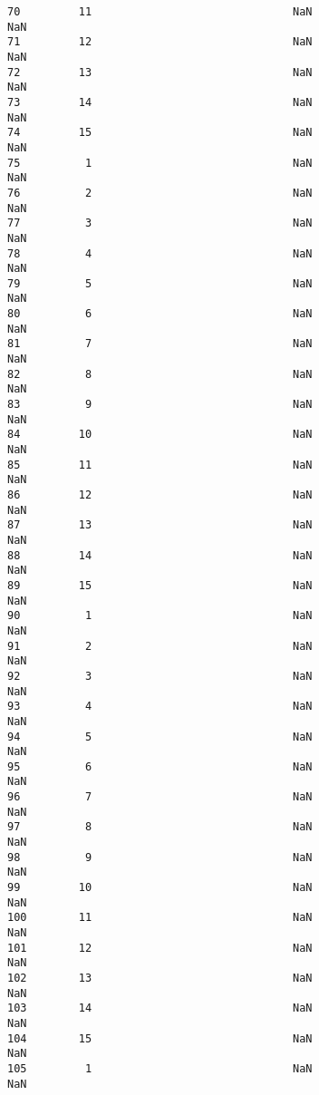 \documentclass[11pt]{article}
\begin{document}
\begin{tcolorbox}[breakable, size=fbox, boxrule=.5pt, pad at break*=1mm, opacityfill=0]
\begin{Verbatim}[commandchars=\\\{\}]
70         11                               NaN                       NaN
71         12                               NaN                       NaN
72         13                               NaN                       NaN
73         14                               NaN                       NaN
74         15                               NaN                       NaN
75          1                               NaN                       NaN
76          2                               NaN                       NaN
77          3                               NaN                       NaN
78          4                               NaN                       NaN
79          5                               NaN                       NaN
80          6                               NaN                       NaN
81          7                               NaN                       NaN
82          8                               NaN                       NaN
83          9                               NaN                       NaN
84         10                               NaN                       NaN
85         11                               NaN                       NaN
86         12                               NaN                       NaN
87         13                               NaN                       NaN
88         14                               NaN                       NaN
89         15                               NaN                       NaN
90          1                               NaN                       NaN
91          2                               NaN                       NaN
92          3                               NaN                       NaN
93          4                               NaN                       NaN
94          5                               NaN                       NaN
95          6                               NaN                       NaN
96          7                               NaN                       NaN
97          8                               NaN                       NaN
98          9                               NaN                       NaN
99         10                               NaN                       NaN
100        11                               NaN                       NaN
101        12                               NaN                       NaN
102        13                               NaN                       NaN
103        14                               NaN                       NaN
104        15                               NaN                       NaN
105         1                               NaN                       NaN

\end{Verbatim}
\end{tcolorbox}
\end{document}
